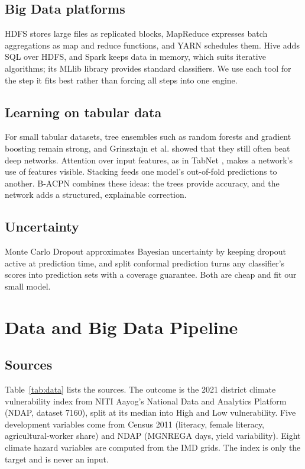 \documentclass[conference]{IEEEtran}
\begin{document}
\subsection{Big Data platforms}
HDFS \cite{shvachko2010} stores large files as replicated blocks, MapReduce \cite{dean2008} expresses batch aggregations as map and reduce functions, and YARN \cite{vavilapalli2013} schedules them. Hive \cite{thusoo2009} adds SQL over HDFS, and Spark \cite{zaharia2016} keeps data in memory, which suits iterative algorithms; its MLlib library \cite{meng2016} provides standard classifiers. We use each tool for the step it fits best rather than forcing all steps into one engine.

\subsection{Learning on tabular data}
For small tabular datasets, tree ensembles such as random forests \cite{breiman2001} and gradient boosting \cite{friedman2001} remain strong, and Grinsztajn et al. \cite{grinsztajn2022} showed that they still often beat deep networks. Attention over input features, as in TabNet \cite{arik2021}, makes a network's use of features visible. Stacking \cite{wolpert1992} feeds one model's out-of-fold predictions to another. B-ACPN combines these ideas: the trees provide accuracy, and the network adds a structured, explainable correction.

\subsection{Uncertainty}
Monte Carlo Dropout \cite{gal2016} approximates Bayesian uncertainty by keeping dropout active at prediction time, and split conformal prediction \cite{angelopoulos2021} turns any classifier's scores into prediction sets with a coverage guarantee. Both are cheap and fit our small model.

\section{Data and Big Data Pipeline}
\subsection{Sources}
Table~\ref{tab:data} lists the sources. The outcome is the 2021 district climate vulnerability index from NITI Aayog's National Data and Analytics Platform (NDAP, dataset 7160), split at its median into High and Low vulnerability. Five development variables come from Census 2011 (literacy, female literacy, agricultural-worker share) and NDAP (MGNREGA days, yield variability). Eight climate hazard variables are computed from the IMD grids. The index is only the target and is never an input.
\end{document}
